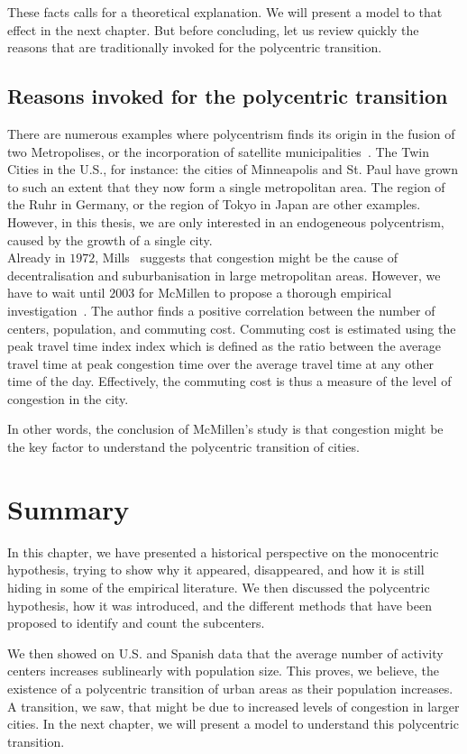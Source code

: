 These facts calls for a theoretical explanation. We will present a model to that
effect in the next chapter. But before concluding, let us review quickly the
reasons that are traditionally invoked for the polycentric transition.

\subsection{Reasons invoked for the polycentric transition}
\label{sec:reasons_invoked_for_the_polycentric_transition}

There are numerous examples where polycentrism finds its origin in the fusion of
two Metropolises, or the incorporation of satellite
municipalities~\cite{LeNechet:2015}. The Twin Cities in the U.S., for instance:
the cities of Minneapolis and St. Paul have grown to such an extent that they now
form a single metropolitan area. The region of the Ruhr in Germany, or the
region of Tokyo in Japan are other examples. However, in this thesis, we are only interested in
an endogeneous polycentrism, caused by the growth of a single city.\\

Already in $1972$, Mills~\cite{Mills:1972} suggests that congestion might be the
cause of decentralisation and suburbanisation in large metropolitan areas.
However, we have to wait until $2003$ for McMillen to propose a thorough
empirical investigation~\cite{McMillen:2003}. The author finds a positive
correlation between the number of centers, population, and commuting cost.
Commuting cost is estimated using the peak travel time index index which is
defined as the ratio between the average travel time at peak congestion time
over the average travel time at any other time of the day. Effectively, the
commuting cost is thus a measure of the level of congestion in the city. 

In other words, the conclusion of McMillen's study is that congestion might be
the key factor to understand the polycentric transition of cities.



\section{Summary}
\label{sec:summary}

In this chapter, we have presented a historical perspective on the monocentric
hypothesis, trying to show why it appeared, disappeared, and how it is still hiding in 
some of the empirical literature. We then discussed the polycentric hypothesis,
how it was introduced, and the different methods that have been proposed to
identify and count the subcenters.

We then showed on U.S. and Spanish data that the average number of activity
centers increases sublinearly with population size. This proves, we believe, the
existence of a polycentric transition of urban areas as their population
increases. A transition, we saw, that might be due to increased levels of
congestion in larger cities. In the next chapter, we will present a model to
understand this polycentric transition. 
